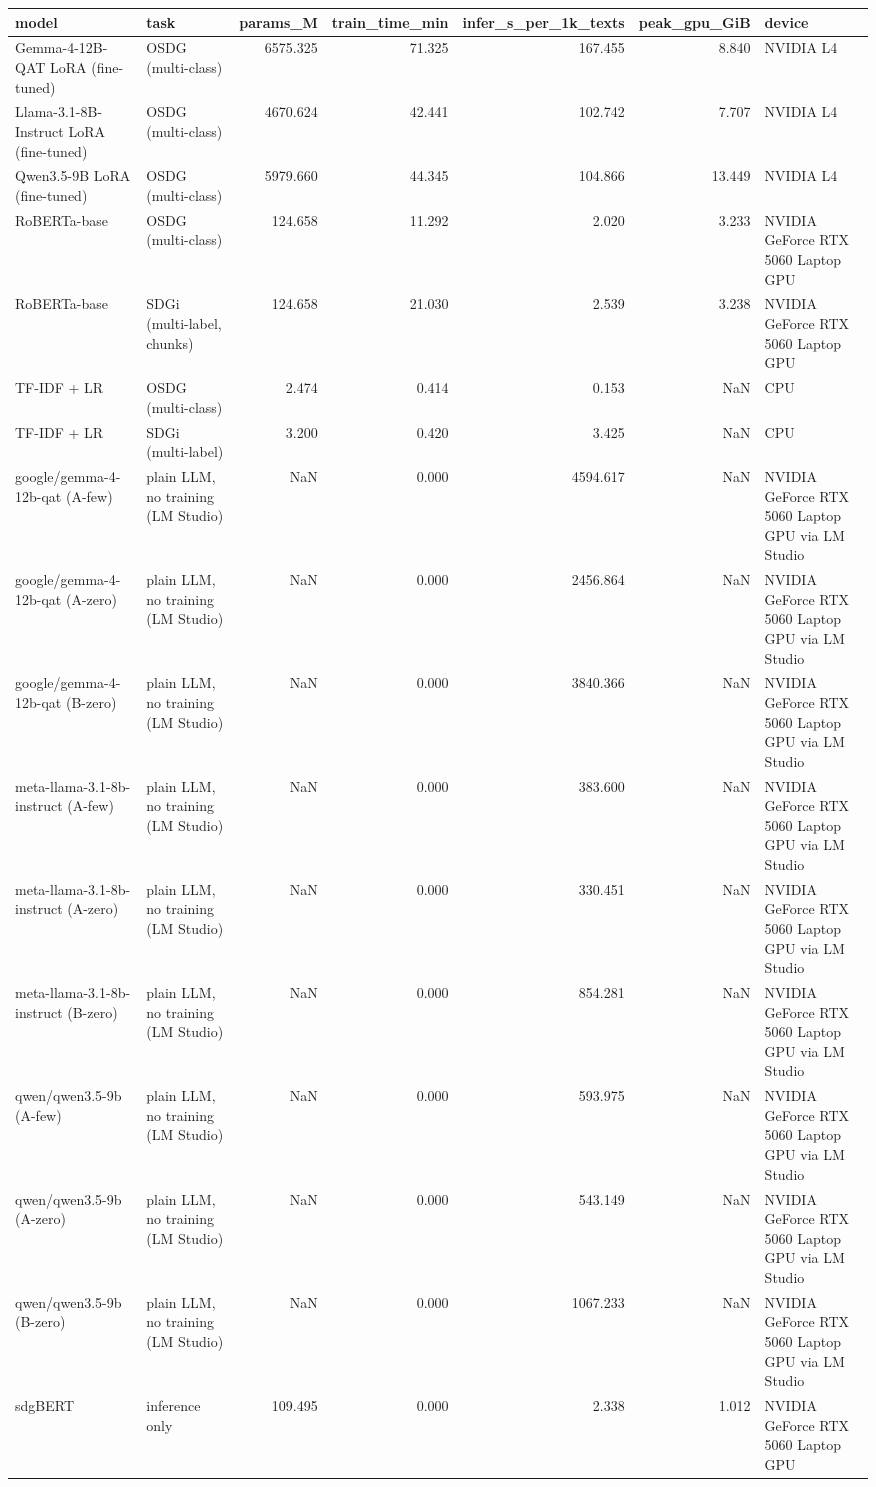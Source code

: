 \begin{tabular}{llrrrrl}
\toprule
model & task & params_M & train_time_min & infer_s_per_1k_texts & peak_gpu_GiB & device \\
\midrule
Gemma-4-12B-QAT LoRA (fine-tuned) & OSDG (multi-class) & 6575.325 & 71.325 & 167.455 & 8.840 & NVIDIA L4 \\
Llama-3.1-8B-Instruct LoRA (fine-tuned) & OSDG (multi-class) & 4670.624 & 42.441 & 102.742 & 7.707 & NVIDIA L4 \\
Qwen3.5-9B LoRA (fine-tuned) & OSDG (multi-class) & 5979.660 & 44.345 & 104.866 & 13.449 & NVIDIA L4 \\
RoBERTa-base & OSDG (multi-class) & 124.658 & 11.292 & 2.020 & 3.233 & NVIDIA GeForce RTX 5060 Laptop GPU \\
RoBERTa-base & SDGi (multi-label, chunks) & 124.658 & 21.030 & 2.539 & 3.238 & NVIDIA GeForce RTX 5060 Laptop GPU \\
TF-IDF + LR & OSDG (multi-class) & 2.474 & 0.414 & 0.153 & NaN & CPU \\
TF-IDF + LR & SDGi (multi-label) & 3.200 & 0.420 & 3.425 & NaN & CPU \\
google/gemma-4-12b-qat (A-few) & plain LLM, no training (LM Studio) & NaN & 0.000 & 4594.617 & NaN & NVIDIA GeForce RTX 5060 Laptop GPU via LM Studio \\
google/gemma-4-12b-qat (A-zero) & plain LLM, no training (LM Studio) & NaN & 0.000 & 2456.864 & NaN & NVIDIA GeForce RTX 5060 Laptop GPU via LM Studio \\
google/gemma-4-12b-qat (B-zero) & plain LLM, no training (LM Studio) & NaN & 0.000 & 3840.366 & NaN & NVIDIA GeForce RTX 5060 Laptop GPU via LM Studio \\
meta-llama-3.1-8b-instruct (A-few) & plain LLM, no training (LM Studio) & NaN & 0.000 & 383.600 & NaN & NVIDIA GeForce RTX 5060 Laptop GPU via LM Studio \\
meta-llama-3.1-8b-instruct (A-zero) & plain LLM, no training (LM Studio) & NaN & 0.000 & 330.451 & NaN & NVIDIA GeForce RTX 5060 Laptop GPU via LM Studio \\
meta-llama-3.1-8b-instruct (B-zero) & plain LLM, no training (LM Studio) & NaN & 0.000 & 854.281 & NaN & NVIDIA GeForce RTX 5060 Laptop GPU via LM Studio \\
qwen/qwen3.5-9b (A-few) & plain LLM, no training (LM Studio) & NaN & 0.000 & 593.975 & NaN & NVIDIA GeForce RTX 5060 Laptop GPU via LM Studio \\
qwen/qwen3.5-9b (A-zero) & plain LLM, no training (LM Studio) & NaN & 0.000 & 543.149 & NaN & NVIDIA GeForce RTX 5060 Laptop GPU via LM Studio \\
qwen/qwen3.5-9b (B-zero) & plain LLM, no training (LM Studio) & NaN & 0.000 & 1067.233 & NaN & NVIDIA GeForce RTX 5060 Laptop GPU via LM Studio \\
sdgBERT & inference only & 109.495 & 0.000 & 2.338 & 1.012 & NVIDIA GeForce RTX 5060 Laptop GPU \\
\bottomrule
\end{tabular}

